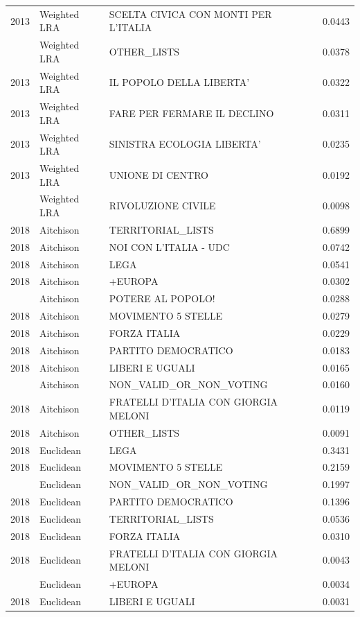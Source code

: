 \begin{longtable}[t]{rllr}
2013 & Weighted LRA & SCELTA CIVICA CON MONTI PER L'ITALIA & 0.0443\\
\addlinespace
2013 & Weighted LRA & OTHER\_LISTS & 0.0378\\
2013 & Weighted LRA & IL POPOLO DELLA LIBERTA' & 0.0322\\
2013 & Weighted LRA & FARE PER FERMARE IL DECLINO & 0.0311\\
2013 & Weighted LRA & SINISTRA ECOLOGIA LIBERTA' & 0.0235\\
2013 & Weighted LRA & UNIONE DI CENTRO & 0.0192\\
\addlinespace
2013 & Weighted LRA & RIVOLUZIONE CIVILE & 0.0098\\
2018 & Aitchison & TERRITORIAL\_LISTS & 0.6899\\
2018 & Aitchison & NOI CON L'ITALIA - UDC & 0.0742\\
2018 & Aitchison & LEGA & 0.0541\\
2018 & Aitchison & +EUROPA & 0.0302\\
\addlinespace
2018 & Aitchison & POTERE AL POPOLO! & 0.0288\\
2018 & Aitchison & MOVIMENTO 5 STELLE & 0.0279\\
2018 & Aitchison & FORZA ITALIA & 0.0229\\
2018 & Aitchison & PARTITO DEMOCRATICO & 0.0183\\
2018 & Aitchison & LIBERI E UGUALI & 0.0165\\
\addlinespace
2018 & Aitchison & NON\_VALID\_OR\_NON\_VOTING & 0.0160\\
2018 & Aitchison & FRATELLI D'ITALIA CON GIORGIA MELONI & 0.0119\\
2018 & Aitchison & OTHER\_LISTS & 0.0091\\
2018 & Euclidean & LEGA & 0.3431\\
2018 & Euclidean & MOVIMENTO 5 STELLE & 0.2159\\
\addlinespace
2018 & Euclidean & NON\_VALID\_OR\_NON\_VOTING & 0.1997\\
2018 & Euclidean & PARTITO DEMOCRATICO & 0.1396\\
2018 & Euclidean & TERRITORIAL\_LISTS & 0.0536\\
2018 & Euclidean & FORZA ITALIA & 0.0310\\
2018 & Euclidean & FRATELLI D'ITALIA CON GIORGIA MELONI & 0.0043\\
\addlinespace
2018 & Euclidean & +EUROPA & 0.0034\\
2018 & Euclidean & LIBERI E UGUALI & 0.0031\\

\end{longtable}
